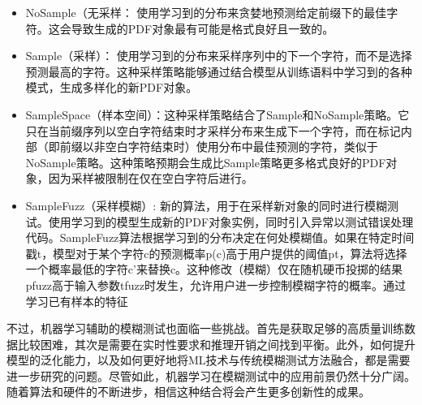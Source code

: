 \documentclass[10.5pt,compsoc]{CjC}
\theoremstyle{mystyle}
\begin{document}
\begin{itemize}
  
  \item NoSample（无采样： 使用学习到的分布来贪婪地预测给定前缀下的最佳字符。这会导致生成的PDF对象最有可能是格式良好且一致的。
  \item Sample（采样）： 使用学习到的分布来采样序列中的下一个字符，而不是选择预测最高的字符。这种采样策略能够通过结合模型从训练语料中学习到的各种模式，生成多样化的新PDF对象。
  \item SampleSpace（样本空间）：这种采样策略结合了Sample和NoSample策略。它只在当前缀序列以空白字符结束时才采样分布来生成下一个字符，而在标记内部（即前缀以非空白字符结束时）使用分布中最佳预测的字符，类似于NoSample策略。这种策略预期会生成比Sample策略更多格式良好的PDF对象，因为采样被限制在仅在空白字符后进行。
  \item SampleFuzz（采样模糊）: 新的算法，用于在采样新对象的同时进行模糊测试。使用学习到的模型生成新的PDF对象实例，同时引入异常以测试错误处理代码。SampleFuzz算法根据学习到的分布决定在何处模糊值。如果在特定时间戳t，模型对于某个字符c的预测概率p(c)高于用户提供的阈值pt，算法将选择一个概率最低的字符c'来替换c。这种修改（模糊）仅在随机硬币投掷的结果pfuzz高于输入参数tfuzz时发生，允许用户进一步控制模糊字符的概率。通过学习已有样本的特征

\end{itemize}

不过，机器学习辅助的模糊测试也面临一些挑战。首先是获取足够的高质量训练数据比较困难，其次是需要在实时性要求和推理开销之间找到平衡。此外，如何提升模型的泛化能力，以及如何更好地将ML技术与传统模糊测试方法融合，都是需要进一步研究的问题。尽管如此，机器学习在模糊测试中的应用前景仍然十分广阔。随着算法和硬件的不断进步，相信这种结合将会产生更多创新性的成果。

\clearpage\clearpage
 

\end{document}
